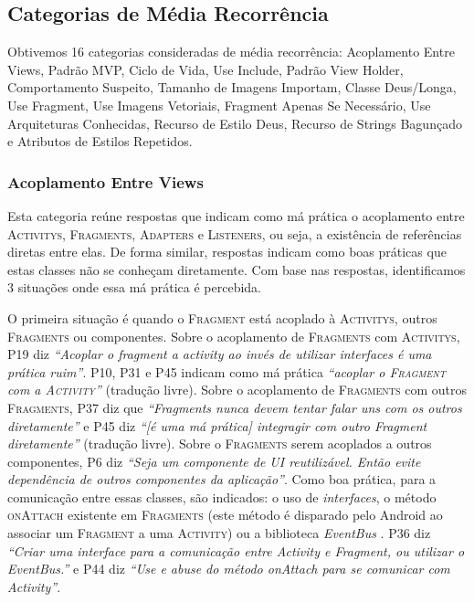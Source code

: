 \subsection{Categorias de M\'edia Recorr\^encia}
Obtivemos 16 categorias consideradas de m\'edia recorr\^encia: Acoplamento Entre Views, Padr\~ao MVP, Ciclo de Vida, Use Include, Padr\~ao View Holder, Comportamento Suspeito, Tamanho de Imagens Importam, Classe Deus/Longa, Use Fragment, Use Imagens Vetoriais, Fragment Apenas Se Necess\'ario, Use Arquiteturas Conhecidas, Recurso de Estilo Deus, Recurso de Strings Bagun\c{c}ado e Atributos de Estilos Repetidos.

\subsubsection{Acoplamento Entre Views}
Esta categoria re\'une respostas que indicam como m\'a pr\'atica o acoplamento entre \textsc{Activitys}, \textsc{Fragments}, \textsc{Adapters} e \textsc{Listeners}, ou seja, a exist\^encia de refer\^encias diretas entre elas. De forma similar, respostas indicam como boas pr\'aticas que estas classes n\~ao se conhe\c{c}am diretamente. Com base nas respostas, identificamos 3 situa\c{c}\~oes onde essa m\'a pr\'atica \'e percebida.

O primeira situa\c{c}\~ao \'e quando o \textsc{Fragment} est\'a acoplado \`a \textsc{Activitys}, outros \textsc{Fragments} ou componentes. Sobre o acoplamento de \textsc{Fragments} com \textsc{Activitys}, P19 diz \textit{``Acoplar o fragment a activity ao inv\'es de utilizar interfaces \'e uma pr\'atica ruim''}. P10, P31 e P45 indicam como m\'a pr\'atica \textit{``acoplar o \textsc{Fragment} com a \textsc{Activity}''} (tradu\c{c}\~ao livre). Sobre o acoplamento de \textsc{Fragments} com outros \textsc{Fragments}, P37 diz que \textit{``Fragments nunca devem tentar falar uns com os outros diretamente''} e P45 diz \textit{``[\'e uma m\'a pr\'atica] integragir com outro Fragment diretamente''} (tradu\c{c}\~ao livre). Sobre o \textsc{Fragments} serem acoplados a outros componentes, P6 diz \textit{``Seja um componente de UI reutiliz\'avel. Ent\~ao evite depend\^encia de outros componentes da aplica\c{c}\~ao''}. Como boa pr\'atica, para a comunica\c{c}\~ao entre essas classes, s\~ao indicados: o uso de \textit{interfaces}, o m\'etodo \textsc{onAttach} existente em \textsc{Fragments} (este m\'etodo \'e disparado pelo Android ao associar um \textsc{Fragment} a uma \textsc{Activity}) ou a biblioteca \textit{EventBus} \cite{EventBusAndroid}. P36 diz \textit{``Criar uma interface para a comunica\c{c}\~ao entre Activity e Fragment, ou utilizar o EventBus.''} e P44 diz \textit{``Use e abuse do m\'etodo onAttach para se comunicar com Activity''}. 

